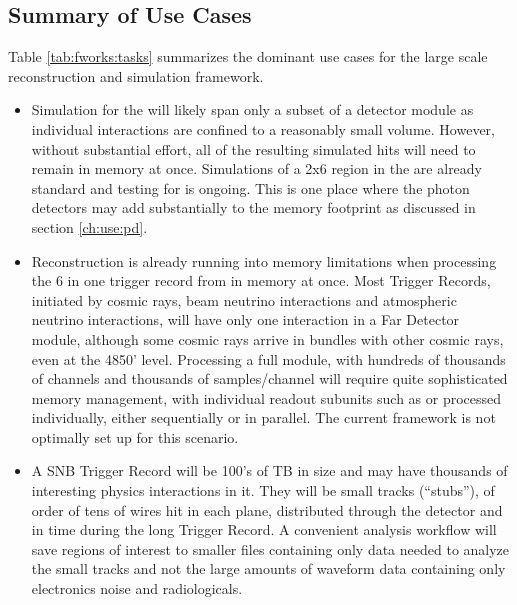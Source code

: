 \documentclass[../main-v1.tex]{subfiles}
\begin{document}
\subsection{Summary of Use Cases}
Table \ref{tab:fworks:tasks} summarizes the dominant use cases for the large scale reconstruction and simulation framework.

\begin{itemize}
\item Simulation for the  will likely span only a subset of a detector module as individual interactions are confined to a reasonably small volume. However, without substantial effort, all of the resulting simulated hits will need to remain in memory at once. Simulations of a 2x6  region in the  are already standard and testing for  is ongoing. This is one place where the photon detectors may add substantially to the memory footprint as discussed in section \ref{ch:use:pd}. 

\item Reconstruction is already running into memory limitations when processing the 6  in one trigger record from  in memory at once.
 Most  Trigger Records, initiated by cosmic rays, beam neutrino interactions and atmospheric neutrino interactions, will have only one interaction in a Far Detector module, although  some cosmic rays arrive in bundles with other cosmic rays, even at the 4850’ level.
Processing a full  module, with hundreds of thousands of channels and thousands of samples/channel will require quite sophisticated memory management, with individual readout subunits such as  or  processed individually, either sequentially or in parallel.  The current  framework is not optimally set up for this scenario. 

\item A SNB Trigger Record will be 100's of TB in size and may have thousands of interesting physics interactions in it.  They will be small tracks (“stubs”), of order of tens of wires hit in each plane, distributed through the detector and in time during the long Trigger Record.  A convenient analysis workflow will save regions of interest to smaller files containing only data needed to analyze the small tracks and not the large amounts of waveform data containing only electronics noise and radiologicals. 



\end{itemize}
\end{document}

